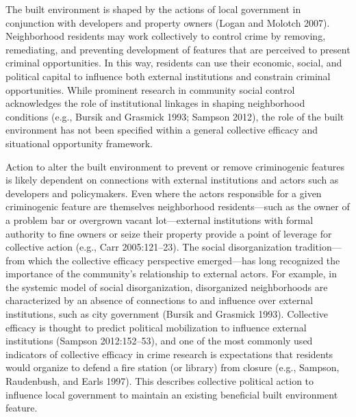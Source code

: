\documentclass [11pt, proquest] {uwthesis}[2015/03/03]
\begin{document}
The built environment is shaped by the actions of local government in conjunction with developers and property owners (Logan and Molotch 2007). Neighborhood residents may work collectively to control crime by removing, remediating, and preventing development of features that are perceived to present criminal opportunities. In this way, residents can use their economic, social, and political capital to influence both external institutions and constrain criminal opportunities. While prominent research in community social control acknowledges the role of institutional linkages in shaping neighborhood conditions (e.g., Bursik and Grasmick 1993; Sampson 2012), the role of the built environment has not been specified within a general collective efficacy and situational opportunity framework.

Action to alter the built environment to prevent or remove criminogenic features is likely dependent on connections with external institutions and actors such as developers and policymakers. Even where the actors responsible for a given criminogenic feature are themselves neighborhood residents---such as the owner of a problem bar or overgrown vacant lot---external institutions with formal authority to fine owners or seize their property provide a point of leverage for collective action (e.g., Carr 2005:121--23). The social disorganization tradition---from which the collective efficacy perspective emerged---has long recognized the importance of the community's relationship to external actors. For example, in the systemic model of social disorganization, disorganized neighborhoods are characterized by an absence of connections to and influence over external institutions, such as city government (Bursik and Grasmick 1993). Collective efficacy is thought to predict political mobilization to influence external institutions (Sampson 2012:152--53), and one of the most commonly used indicators of collective efficacy in crime research is expectations that residents would organize to defend a fire station (or library) from closure (e.g., Sampson, Raudenbush, and Earls 1997). This describes collective political action to influence local government to maintain an existing beneficial built environment feature.
\end{document}
